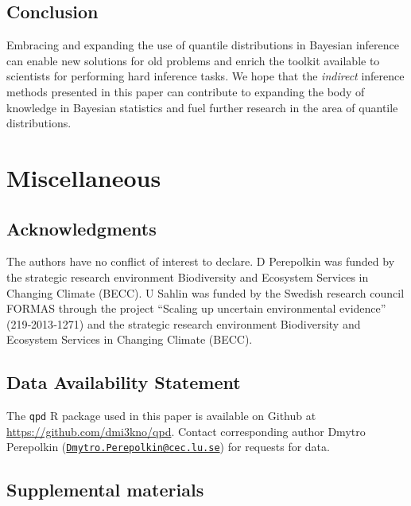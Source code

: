 \documentclass[
  12pt,
]{article}
\begin{document}
\hypertarget{conclusion}{%
\subsection{Conclusion}\label{conclusion}}

Embracing and expanding the use of quantile distributions in Bayesian inference can enable new solutions for old problems and enrich the toolkit available to scientists for performing hard inference tasks. We hope that the \emph{indirect} inference methods presented in this paper can contribute to expanding the body of knowledge in Bayesian statistics and fuel further research in the area of quantile distributions.

\hypertarget{miscellaneous}{%
\section*{Miscellaneous}\label{miscellaneous}}

\hypertarget{acknowledgments}{%
\subsection*{Acknowledgments}\label{acknowledgments}}

The authors have no conﬂict of interest to declare. D Perepolkin was funded by the strategic research environment Biodiversity and Ecosystem
Services in Changing Climate (BECC). U Sahlin was funded by the Swedish research council FORMAS through the project ``Scaling up
uncertain environmental evidence'' (219‐2013‐1271) and the strategic research environment Biodiversity and Ecosystem
Services in Changing Climate (BECC).

\hypertarget{data-availability-statement}{%
\subsection*{Data Availability Statement}\label{data-availability-statement}}

The \texttt{qpd} R package used in this paper is available on Github at \url{https://github.com/dmi3kno/qpd}. Contact corresponding author Dmytro Perepolkin (\href{mailto:Dmytro.Perepolkin@cec.lu.se}{\nolinkurl{Dmytro.Perepolkin@cec.lu.se}}) for requests for data.

\hypertarget{supplemental-materials}{%
\subsection*{Supplemental materials}\label{supplemental-materials}}
\end{document}
